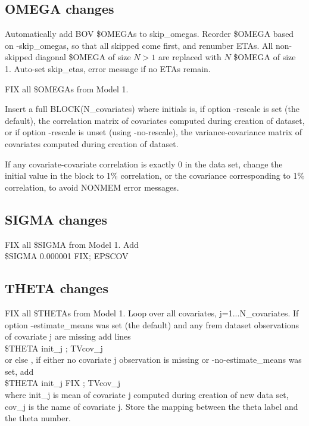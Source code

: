 \subsection{OMEGA changes}
Automatically add BOV \$OMEGAs to skip\_omegas.
Reorder \$OMEGA based on -skip\_omegas, so that all skipped come first, and renumber ETAs.
All non-skipped diagonal \$OMEGA of size $N>1$
are replaced with $N$ \$OMEGA of size 1.
Auto-set skip\_etas, error message if no ETAs remain.

FIX all \$OMEGAs from Model 1.

Insert
a full BLOCK(N\_covariates) where initials is,
if option -rescale is set (the default), the correlation matrix of covariates computed during
creation of dataset, or if option -rescale is unset (using -no-rescale),
the variance-covariance matrix of covariates computed during creation of dataset.

If any covariate-covariate correlation is exactly 0 in the data set, change the initial
value in the block to 1\% correlation, or the covariance corresponding to 1\% correlation,
to avoid NONMEM error messages.

\subsection{SIGMA changes}
FIX all \$SIGMA from Model 1.
Add\\
\$SIGMA 0.000001 FIX; EPSCOV

\subsection{THETA changes}
FIX all \$THETAs from Model 1.
Loop over all covariates, j=1...N\_covariates. %
If option -estimate\_means was set (the default)
and any frem dataset observations of covariate j are missing add lines\\
\$THETA init\_j ; TVcov\_j\\
or else , if either no covariate j observation is missing or
-no-estimate\_means was set, add \\
\$THETA init\_j FIX ; TVcov\_j\\
where init\_j is mean of covariate j computed during creation
of new data set, cov\_j is the name of covariate
j. %
Store the mapping between the theta label and the theta number.%
